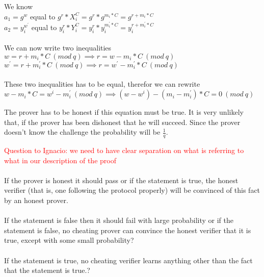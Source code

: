 \begin{infobox}
We know\\
\begin{math} a_1= g^w \end{math} equal to \begin{math}g^r * X_i^C=g^r*g^{m_i*C} = g^{r+m_i*C}\end{math}\\
\begin{math} a_2= y_i^{w^{'}}\end{math} equal to \begin{math}y_i^r * Y_i^C=y_i^r*y_i^{m_i^{'}*C} = y_i^{r+m_i^{'}*C}\end{math}\\\\
We can now write two inequalities\\
\begin{math} w= r+m_i * C\ (mod\ q) \implies r= w-m_i*C\ (mod\ q) \end{math}\\
\begin{math} w^{'}= r+m_i^{'} * C\ (mod\ q) \implies r= w^{'}-m_i^{'} * C\ (mod\ q) \end{math}\\\\
These two inequalities has to be equal, therefor we can rewrite\\
\begin{math}w-m_i*C = w^i-m_i^{'}\ (mod\ q) \implies (w-w^i)-(m_i - m_i^{'}) * C = 0 \ (mod\ q) \end{math}
\end{infobox}


\noindent
The prover has to be honest if this equation must be true. It is very unlikely that, if the prover has been dishonest that he will succeed. Since the prover doesn't know the challenge the probability will be \begin{math} \frac{1}{q}\end{math}.


\begin{infobox}
\textcolor{red}{Question to Ignacio: we need to have clear separation on what is referring to what in our description of the proof}\\\\
 If the prover is honest it should pass or if the statement is true, the honest verifier (that is, one following the protocol properly)
will be convinced of this fact by an honest prover.\\\\
If the statement is false then it should fail with large probability or if the statement is false, no cheating prover can convince
the honest verifier that it is true, except with some small probability?\\\\
 If the statement is true, no cheating verifier learns anything other than the fact that the statement is true.?
\end{infobox}

